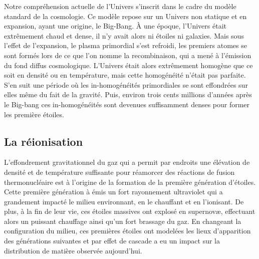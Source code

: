 Notre compréhension actuelle de l'Univers s'inscrit dans le cadre du modèle standard de la cosmologie.
Ce modèle repose sur un Univers non statique et en expansion, ayant une origine, le Big-Bang.
À une époque, l'Univers était extrêmement chaud et dense, il n'y avait alors ni étoiles ni galaxies.
Mais sous l'effet de l'expansion, le plasma primordial s'est refroidi, les premiers atomes se sont formés lors de ce que l'on nomme la recombinaison, qui a mené à l'émission du fond diffus cosmologique.
L'Univers était alors extrêmement homogène que ce soit en densité ou en température, mais cette homogénéité n'était pas parfaite.
S'en suit une période où les in-homogénéités primordiales se sont effondrées sur elles même du fait de la gravité.
Puis, environ trois cents millions d'années après le Big-bang ces in-homogénéités sont devenues suffisamment denses pour former les première étoiles.

\subsection*{La réionisation}
L'effondrement gravitationnel du gaz qui a permit par endroits une élévation de densité et de température suffisante pour réamorcer des réactions de fusion thermonucléaire est à l'origine de la formation de la première génération d'étoiles.
Cette première génération à émis un fort rayonnement ultraviolet qui a grandement impacté le milieu environnant, en le chauffant et en l'ionisant. %
De plus, à la fin de leur vie, ces étoiles massives ont explosé en supernovæ, effectuant alors un puissant chauffage ainsi qu'un fort brassage du gaz.
En changeant la configuration du milieu, ces premières étoiles ont modelées les lieux d'apparition des générations suivantes et par effet de cascade a eu un impact sur la distribution de matière observée aujourd'hui.

